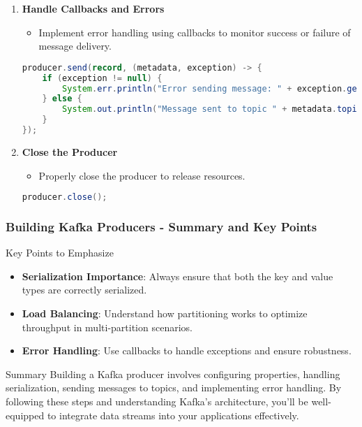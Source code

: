 \documentclass[aspectratio=169]{beamer}
\begin{document}
\begin{frame}[fragile]
\begin{enumerate}
        \item \textbf{Handle Callbacks and Errors}
        \begin{itemize}
            \item Implement error handling using callbacks to monitor success or failure of message delivery.
        \end{itemize}
        \begin{lstlisting}[language=java]
producer.send(record, (metadata, exception) -> {
    if (exception != null) {
        System.err.println("Error sending message: " + exception.getMessage());
    } else {
        System.out.println("Message sent to topic " + metadata.topic() + " at offset " + metadata.offset());
    }
});
        \end{lstlisting}
        
        \item \textbf{Close the Producer}
        \begin{itemize}
            \item Properly close the producer to release resources.
        \end{itemize}
        \begin{lstlisting}[language=java]
producer.close();
        \end{lstlisting}
    \end{enumerate}
\end{frame}

\begin{frame}[fragile]
    \frametitle{Building Kafka Producers - Summary and Key Points}
    \begin{block}{Key Points to Emphasize}
        \begin{itemize}
            \item \textbf{Serialization Importance}: Always ensure that both the key and value types are correctly serialized.
            \item \textbf{Load Balancing}: Understand how partitioning works to optimize throughput in multi-partition scenarios.
            \item \textbf{Error Handling}: Use callbacks to handle exceptions and ensure robustness.
        \end{itemize}
    \end{block}
    
    \begin{block}{Summary}
        Building a Kafka producer involves configuring properties, handling serialization, sending messages to topics, and implementing error handling. By following these steps and understanding Kafka’s architecture, you’ll be well-equipped to integrate data streams into your applications effectively.
    \end{block}
\end{frame}
\end{document}
